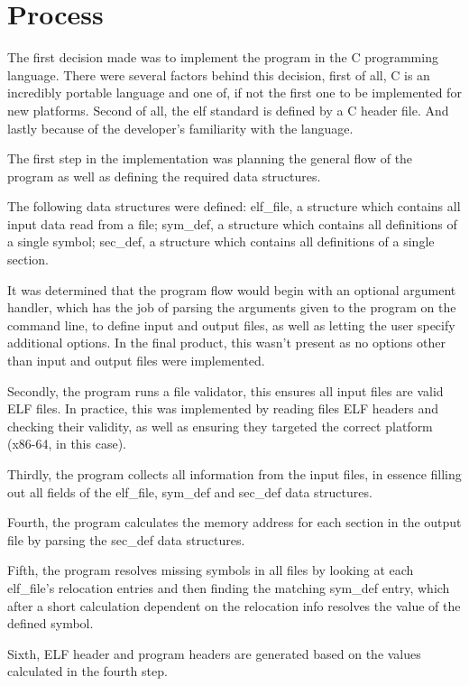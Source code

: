 \documentclass{article}
\begin{document}
\section{Process}

The first decision made was to implement the program in the C programming language. There were several factors behind this decision, first of all, C is an incredibly portable language and one of, if not the first one to be implemented for new platforms. Second of all, the elf standard is defined by a C header file. And lastly because of the developer's familiarity with the language.

The first step in the implementation was planning the general flow of the program as well as defining the required data structures.

The following data structures were defined: elf\_file, a structure which contains all input data read from a file; sym\_def, a structure which contains all definitions of a single symbol; sec\_def, a structure which contains all definitions of a single section.

It was determined that the program flow would begin with an optional argument handler, which has the job of parsing the arguments given to the program on the command line, to define input and output files, as well as letting the user specify additional options. In the final product, this wasn't present as no options other than input and output files were implemented.

Secondly, the program runs a file validator, this ensures all input files are valid ELF files. In practice, this was implemented by reading files ELF headers and checking their validity, as well as ensuring they targeted the correct platform (x86-64, in this case).

Thirdly, the program collects all information from the input files, in essence filling out all fields of the elf\_file, sym\_def and sec\_def data structures.

Fourth, the program calculates the memory address for each section in the output file by parsing the sec\_def data structures.

Fifth, the program resolves missing symbols in all files by looking at each elf\_file's relocation entries and then finding the matching sym\_def entry, which after a short calculation dependent on the relocation info resolves the value of the defined symbol.

Sixth, ELF header and program headers are generated based on the values calculated in the fourth step.
\end{document}
